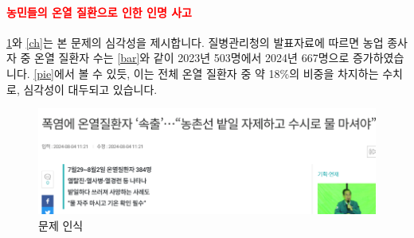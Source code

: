 \documentclass[12pt]{article}
\begin{document}
                \paragraph{\textbf{\textcolor{red}{농민들의 온열 질환으로 인한 인명 사고}}}
                \cref{news}와 \cref{ch}는 본 문제의 심각성을 제시합니다.\cite{news}
                질병관리청의 발표자료\cite{src}에 따르면 농업 종사자 중 온열 질환자 수는 \cref{bar}와 같이 2023년 503명에서 2024년 667명으로 증가하였습니다.
                \cref{pie}에서 볼 수 있듯, 이는 전체 온열 질환자 중 약 18\%의 비중을 차지하는 수치로, 심각성이 대두되고 있습니다.
            \begin{figure}[H]
                \centering
                \includegraphics[width=.5\textwidth]{news.png}
                \caption{문제 인식}
                \label{news}
            \end{figure}
\end{document}
